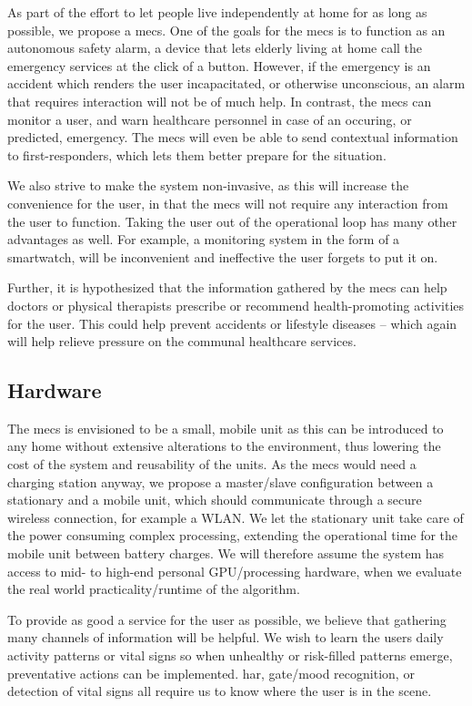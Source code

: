 As part of the effort to let people live independently at home for as long as possible, we propose a \gls{mecs}. One of the goals for the \gls{mecs} is to function as an autonomous safety alarm, a device that lets elderly living at home call the emergency services at the click of a button. However, if the emergency is an accident which renders the user incapacitated, or otherwise unconscious, an alarm that requires interaction will not be of much help. In contrast, the \gls{mecs} can monitor a user, and warn healthcare personnel in case of an occuring, or predicted, emergency. The \gls{mecs} will even be able to send contextual information to first-responders, which lets them better prepare for the situation.

We also strive to make the system non-invasive, as this will increase the convenience for the user, in that the \gls{mecs} will not require any interaction from the user to function. Taking the user out of the operational loop has many other advantages as well. For example, a monitoring system in the form of a smartwatch, will be inconvenient and ineffective the user forgets to put it on.

Further, it is hypothesized that the information gathered by the \gls{mecs} can help doctors or physical therapists prescribe or recommend health-promoting activities for the user. This could help prevent accidents or lifestyle diseases -- which again will help relieve pressure on the communal healthcare services.

\subsection{Hardware}
The \gls{mecs} is envisioned to be a small, mobile unit as this can be introduced to any home without extensive alterations to the environment, thus lowering the cost of the system and reusability of the units. As the \gls{mecs} would need a charging station anyway, we propose a master/slave configuration between a stationary and a mobile unit, which should communicate through a secure wireless connection, for example a WLAN. We let the stationary unit take care of the power consuming complex processing, extending the operational time for the mobile unit between battery charges. We will therefore assume the system has access to mid- to high-end personal GPU/processing hardware, when we evaluate the real world practicality/runtime of the algorithm.

To provide as good a service for the user as possible, we believe that gathering many channels of information will be helpful. We wish to learn the users daily activity patterns or vital signs so when unhealthy or risk-filled patterns emerge, preventative actions can be implemented. \gls{har}, gate/mood recognition, or detection of vital signs all require us to know where the user is in the scene.

